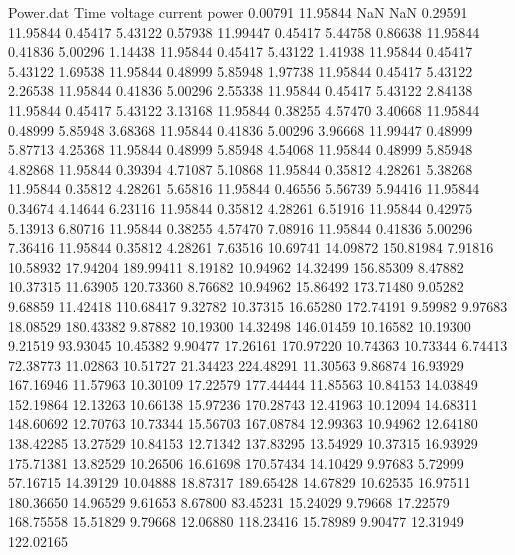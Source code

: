 \begin{filecontents}{Power.dat}
Time voltage current power
   0.00791   11.95844        NaN        NaN
   0.29591   11.95844    0.45417    5.43122
   0.57938   11.99447    0.45417    5.44758
   0.86638   11.95844    0.41836    5.00296
   1.14438   11.95844    0.45417    5.43122
   1.41938   11.95844    0.45417    5.43122
   1.69538   11.95844    0.48999    5.85948
   1.97738   11.95844    0.45417    5.43122
   2.26538   11.95844    0.41836    5.00296
   2.55338   11.95844    0.45417    5.43122
   2.84138   11.95844    0.45417    5.43122
   3.13168   11.95844    0.38255    4.57470
   3.40668   11.95844    0.48999    5.85948
   3.68368   11.95844    0.41836    5.00296
   3.96668   11.99447    0.48999    5.87713
   4.25368   11.95844    0.48999    5.85948
   4.54068   11.95844    0.48999    5.85948
   4.82868   11.95844    0.39394    4.71087
   5.10868   11.95844    0.35812    4.28261
   5.38268   11.95844    0.35812    4.28261
   5.65816   11.95844    0.46556    5.56739
   5.94416   11.95844    0.34674    4.14644
   6.23116   11.95844    0.35812    4.28261
   6.51916   11.95844    0.42975    5.13913
   6.80716   11.95844    0.38255    4.57470
   7.08916   11.95844    0.41836    5.00296
   7.36416   11.95844    0.35812    4.28261
   7.63516   10.69741   14.09872  150.81984
   7.91816   10.58932   17.94204  189.99411
   8.19182   10.94962   14.32499  156.85309
   8.47882   10.37315   11.63905  120.73360
   8.76682   10.94962   15.86492  173.71480
   9.05282    9.68859   11.42418  110.68417
   9.32782   10.37315   16.65280  172.74191
   9.59982    9.97683   18.08529  180.43382
   9.87882   10.19300   14.32498  146.01459
  10.16582   10.19300    9.21519   93.93045
  10.45382    9.90477   17.26161  170.97220
  10.74363   10.73344    6.74413   72.38773
  11.02863   10.51727   21.34423  224.48291
  11.30563    9.86874   16.93929  167.16946
  11.57963   10.30109   17.22579  177.44444
  11.85563   10.84153   14.03849  152.19864
  12.13263   10.66138   15.97236  170.28743
  12.41963   10.12094   14.68311  148.60692
  12.70763   10.73344   15.56703  167.08784
  12.99363   10.94962   12.64180  138.42285
  13.27529   10.84153   12.71342  137.83295
  13.54929   10.37315   16.93929  175.71381
  13.82529   10.26506   16.61698  170.57434
  14.10429    9.97683    5.72999   57.16715
  14.39129   10.04888   18.87317  189.65428
  14.67829   10.62535   16.97511  180.36650
  14.96529    9.61653    8.67800   83.45231
  15.24029    9.79668   17.22579  168.75558
  15.51829    9.79668   12.06880  118.23416
  15.78989    9.90477   12.31949  122.02165

\end{filecontents}
